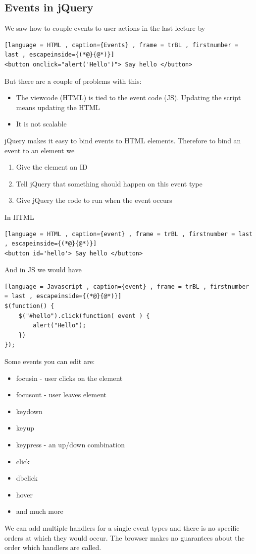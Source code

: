 \documentclass[a4paper]{article}
\theoremstyle{plain}
\theoremstyle{definition}
\theoremstyle{remark}
\begin{document}
\begin{flushleft}
\subsection{Events in jQuery}
We saw how to couple events to user actions in the last lecture by
\begin{lstlisting}[language = HTML , caption={Events} , frame = trBL , firstnumber = last , escapeinside={(*@}{@*)}]
<button onclick="alert('Hello')"> Say hello </button>
\end{lstlisting}
But there are a couple of problems with this:
\begin{itemize}
	\item The viewcode (HTML) is tied to the event code (JS). Updating the script means updating the HTML
	\item It is not scalable
\end{itemize}
jQuery makes it easy to bind events to HTML elements. Therefore to bind an event to an element we
\begin{enumerate}
	\item Give the element an ID
	\item Tell jQuery that something should happen on this event type
	\item Give jQuery the code to run when the event occurs
\end{enumerate}
In HTML
\begin{lstlisting}[language = HTML , caption={event} , frame = trBL , firstnumber = last , escapeinside={(*@}{@*)}]
<button id='hello'> Say hello </button>
\end{lstlisting}
And in JS we would have
\begin{lstlisting}[language = Javascript , caption={event} , frame = trBL , firstnumber = last , escapeinside={(*@}{@*)}]
$(function() {
	$("#hello").click(function( event ) {
		alert("Hello");
	})
});
\end{lstlisting}
Some events you can edit are:
\begin{itemize}
	\item focusin - user clicks on the element
	\item focusout - user leaves element
	\item keydown
	\item keyup
	\item keypress - an up/down combination
	\item click
	\item dbclick
	\item hover
	\item and much more
\end{itemize}
We can add multiple handlers for a single event types and there is no specific orders at which they would occur. The browser makes no guarantees about the order which handlers are called. 


\end{flushleft}
\end{document}
